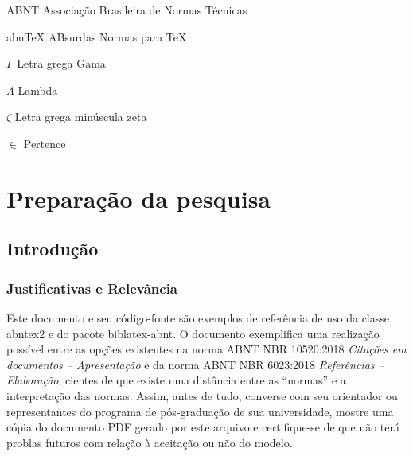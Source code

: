 \documentclass[
	12pt,				%
	openright,			%
	twoside,			%
	a4paper,			%
	english,			%
	brazil				%
	]{abntex2}
\begin{document}
\begin{siglas}
  \item[ABNT] Associação Brasileira de Normas Técnicas
  \item[abnTeX] ABsurdas Normas para TeX
\end{siglas}

\begin{simbolos}
  \item[$ \Gamma $] Letra grega Gama
  \item[$ \Lambda $] Lambda
  \item[$ \zeta $] Letra grega minúscula zeta
  \item[$ \in $] Pertence
\end{simbolos}

\tableofcontents*
\cleardoublepage
\makeatletter
{}
\makeatother



\textual
\part{Preparação da pesquisa}
%
\chapter[Introdução]{Introdução}

\section{Justificativas e Relevância}
%
Este documento e seu código-fonte são exemplos de referência de uso da classe
\textsf{abntex2} e do pacote \textsf{biblatex-abnt}. O documento exemplifica uma realização possível entre as opções existentes na norma ABNT NBR 10520:2018 \emph{Citações em documentos -- Apresentação} e da norma ABNT NBR 6023:2018 \emph{Referências -- Elaboração}, cientes de que existe uma distância entre as ``normas'' e a interpretação das normas. Assim, antes de tudo, converse com seu orientador ou representantes do programa de pós-graduação de sua universidade, mostre uma cópia do documento PDF gerado por este arquivo e certifique-se de que não terá problas futuros com relação à aceitação ou não do modelo.
\end{document}

